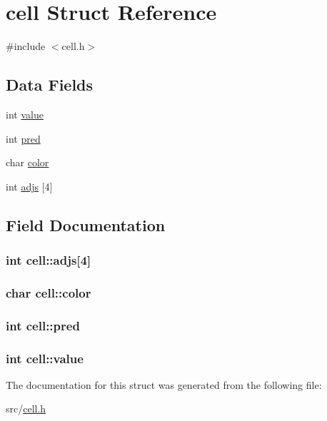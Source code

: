 \hypertarget{structcell}{\section{cell Struct Reference}
\label{structcell}
}


{\ttfamily \#include $<$cell.\-h$>$}

\subsection*{Data Fields}
\begin{DoxyCompactItemize}
\item 
int \hyperlink{structcell_a500181b46ea51bd5435ed7b2cb1b8971}{value}
\item 
int \hyperlink{structcell_a91e75ee35be0768b8d45913f1d79d63f}{pred}
\item 
char \hyperlink{structcell_a32b9dbfb24547f3bd3e8efb30adc94f8}{color}
\item 
int \hyperlink{structcell_a55cbaecac2aaeba9aa5000cb535ff278}{adjs} \mbox{[}4\mbox{]}
\end{DoxyCompactItemize}


\subsection{Field Documentation}
\hypertarget{structcell_a55cbaecac2aaeba9aa5000cb535ff278}{
\subsubsection[{adjs}]{\setlength{\rightskip}{0pt plus 5cm}int cell\-::adjs\mbox{[}4\mbox{]}}}\label{structcell_a55cbaecac2aaeba9aa5000cb535ff278}
\hypertarget{structcell_a32b9dbfb24547f3bd3e8efb30adc94f8}{
\subsubsection[{color}]{\setlength{\rightskip}{0pt plus 5cm}char cell\-::color}}\label{structcell_a32b9dbfb24547f3bd3e8efb30adc94f8}
\hypertarget{structcell_a91e75ee35be0768b8d45913f1d79d63f}{
\subsubsection[{pred}]{\setlength{\rightskip}{0pt plus 5cm}int cell\-::pred}}\label{structcell_a91e75ee35be0768b8d45913f1d79d63f}
\hypertarget{structcell_a500181b46ea51bd5435ed7b2cb1b8971}{
\subsubsection[{value}]{\setlength{\rightskip}{0pt plus 5cm}int cell\-::value}}\label{structcell_a500181b46ea51bd5435ed7b2cb1b8971}


The documentation for this struct was generated from the following file\-:\begin{DoxyCompactItemize}
\item 
src/\hyperlink{cell_8h}{cell.\-h}\end{DoxyCompactItemize}
